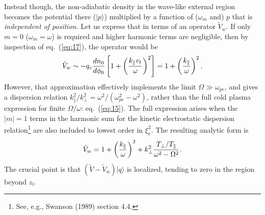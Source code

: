 \documentclass[12pt]{article}
\def\ket#1{|#1\rangle}
\begin{document}
Instead though, the non-adiabatic density in the wave-like external region
becomes the potential there ($\ket{p}$) multiplied by a function of
($\omega_m$ and) $p$ that is \emph{independent of position}. Let us
express that in terms of an operator $\tilde{V}_{w}$. If only $m=0$
($\omega_m=\omega$) is
required and higher harmonic terms are negligible, then by inspection
of eq.\ (\ref{eq:17}), the operator
would be 
\begin{equation}
  \label{eq:20}
\tilde{V}_{w}\sim-q_e{dn_0\over d\phi_0}\left[1+\left(k_\parallel v_t\over\omega\right)^2\right]=1+\left(k_\parallel\over\omega\right)^2.
\end{equation}
However, that approximation effectively implements the limit
$\Omega\gg \omega_{pe}$, and gives a dispersion relation
$k_\parallel^2/k_\perp^2 = \omega^2/(\omega_{pe}^2-\omega^2)$, rather
than the full cold plasma expression for finite $\Omega/\omega$: eq.\
(\ref{eq:15}). The full expression arises when the $|m|=1$ terms in
the harmonic sum for the kinetic electrostatic dispersion
relation\footnote{See, e.g., Swanson (1989) section 4.4.} are also
included to lowest order in $\xi_t^2$. The resulting analytic form is
\begin{equation}
  \label{eq:24}
  \tilde V_w= 1 + \left(k_\parallel\over\omega\right)^2 +
  k_\perp^2 {T_\perp/T_\parallel\over\omega^2-\Omega^2}.
\end{equation}
The crucial point is that $(\tilde{V}-\tilde{V}_{w})\ket{q}$ is
localized, tending to zero in the region beyond $z_l$.
\end{document}
